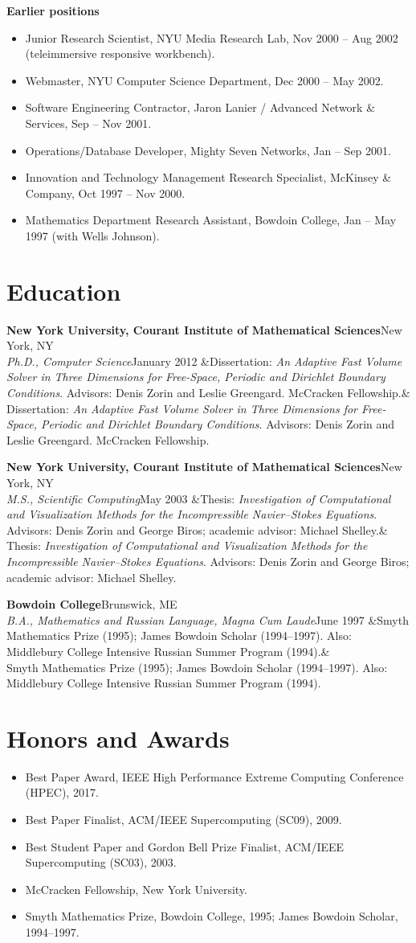 \documentclass[10pt,letterpaper]{article}
\newcommand{\job}[5]{%
  \textbf{#1}\hfill{\color{muted}#2}\\
  \textit{#3}\hfill{\color{muted}#4}%
  \ifx&#5&\else\\[1pt]{\small #5}\fi
  \par\vspace{6pt}}
\begin{document}
{\textbf{Earlier positions}\par\vspace{2pt}
{\small
\begin{itemize}
  \item Junior Research Scientist, NYU Media Research Lab, Nov 2000 -- Aug 2002 (teleimmersive responsive workbench).
  \item Webmaster, NYU Computer Science Department, Dec 2000 -- May 2002.
  \item Software Engineering Contractor, Jaron Lanier / Advanced Network \& Services, Sep -- Nov 2001.
  \item Operations/Database Developer, Mighty Seven Networks, Jan -- Sep 2001.
  \item Innovation and Technology Management Research Specialist, McKinsey \& Company, Oct 1997 -- Nov 2000.
  \item Mathematics Department Research Assistant, Bowdoin College, Jan -- May 1997 (with Wells Johnson).
\end{itemize}}

\section{Education}

\job{New York University, Courant Institute of Mathematical Sciences}{New York, NY}
    {Ph.D., Computer Science}{January 2012}
    {Dissertation: \textit{An Adaptive Fast Volume Solver in Three Dimensions for Free-Space, Periodic and
     Dirichlet Boundary Conditions}. Advisors: Denis Zorin and Leslie Greengard. McCracken Fellowship.}

\job{New York University, Courant Institute of Mathematical Sciences}{New York, NY}
    {M.S., Scientific Computing}{May 2003}
    {Thesis: \textit{Investigation of Computational and Visualization Methods for the Incompressible
     Navier--Stokes Equations}. Advisors: Denis Zorin and George Biros; academic advisor: Michael Shelley.}

\job{Bowdoin College}{Brunswick, ME}
    {B.A., Mathematics and Russian Language, Magna Cum Laude}{June 1997}
    {Smyth Mathematics Prize (1995); James Bowdoin Scholar (1994--1997). Also: Middlebury College Intensive
     Russian Summer Program (1994).}

\section{Honors and Awards}
\begin{itemize}
  \item Best Paper Award, IEEE High Performance Extreme Computing Conference (HPEC), 2017.
  \item Best Paper Finalist, ACM/IEEE Supercomputing (SC09), 2009.
  \item Best Student Paper and Gordon Bell Prize Finalist, ACM/IEEE Supercomputing (SC03), 2003.
  \item McCracken Fellowship, New York University.
  \item Smyth Mathematics Prize, Bowdoin College, 1995; James Bowdoin Scholar, 1994--1997.
\end{itemize}

}
\end{document}

